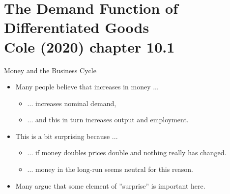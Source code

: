 \documentclass[10pt,c,aspectratio=1610,handout]{beamer}
\begin{document}
\section{The Demand Function of Differentiated Goods\\{\small Cole (2020) chapter 10.1}}%
\begin{frame}{Money and the Business Cycle}%
  \begin{itemize}%
    \item[$\blacktriangleright$] Many people believe that increases in money ...%
    \begin{itemize}%
      \item[$\rightarrow$] ... increases nominal demand,%
      \item[$\rightarrow$] ... and this in turn increases output and employment.%
    \end{itemize}%
    \vspace*{0.2in}%
    \pause%
    \item[$\blacktriangleright$] This is a bit surprising because ...%
    \begin{itemize}%
      \item[$\rightarrow$] ... if money doubles prices double and nothing really has changed.%
      \item[$\rightarrow$] ... money in the long-run seems neutral for this reason.%
    \end{itemize}%
    \vspace*{0.2in}%
    \pause%
    \item[$\blacktriangleright$] Many argue that some element of ''surprise'' is important here.%
  \end{itemize}%
\end{frame}%
\end{document}
